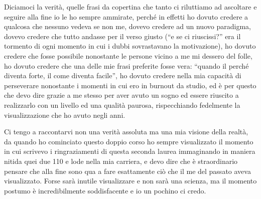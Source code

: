 \documentclass[12pt, a4paper]{report}
\begin{document}
Diciamoci la verità, quelle frasi da copertina che tanto ci riluttiamo ad ascoltare e seguire alla fine io le ho sempre ammirate, perché in effetti ho dovuto credere a qualcosa che nessuno vedeva se non me, dovevo credere ad un nuovo paradigma, dovevo credere che tutto andasse per il verso giusto (``e se ci riuscissi?'' era il tormento di ogni momento in cui i dubbi sovrastavano la motivazione), ho dovuto credere che fosse possibile nonostante le persone vicino a me mi dessero del folle, ho dovuto credere che una delle mie frasi preferite fosse vera: ``quando il perché diventa forte, il come diventa facile'', ho dovuto credere nella mia capacità di perseverare nonostante i momenti in cui ero in burnout da studio, ed è per questo che devo dire grazie a me stesso per aver avuto un sogno ed essere riuscito a realizzarlo con un livello ed una qualità paurosa, rispecchiando fedelmente la visualizzazione che ho avuto negli anni. 
\par
Ci tengo a raccontarvi non una verità assoluta ma una mia visione della realtà, da quando ho cominciato questo doppio corso ho sempre visualizzato il momento in cui scrivevo i ringraziamenti di questa seconda laurea immaginando in maniera nitida quei due 110 e lode nella mia carriera, e devo dire che è straordinario pensare che alla fine sono qua a fare esattamente ciò che il me del passato aveva visualizzato. Forse sarà inutile visualizzare e non sarà una scienza, ma il momento postumo è incredibilmente soddisfacente e io un pochino ci credo.

\par
\vspace{\baselineskip}
\end{document}
